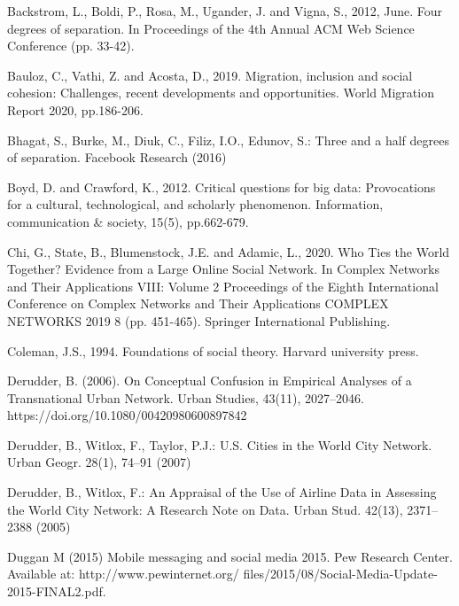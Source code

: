 \documentclass[12pt]{article}
\begin{document}
Backstrom, L., Boldi, P., Rosa, M., Ugander, J. and Vigna, S., 2012, June. Four degrees of separation. In Proceedings of the 4th Annual ACM Web Science Conference (pp. 33-42).
\newline

Bauloz, C., Vathi, Z. and Acosta, D., 2019. Migration, inclusion and social cohesion: Challenges, recent developments and opportunities. World Migration Report 2020, pp.186-206.
\newline

Bhagat, S., Burke, M., Diuk, C., Filiz, I.O., Edunov, S.: Three and a half degrees of separation. Facebook Research (2016)
\newline

Boyd, D. and Crawford, K., 2012. Critical questions for big data: Provocations for a cultural, technological, and scholarly phenomenon. Information, communication \& society, 15(5), pp.662-679.
\newline

Chi, G., State, B., Blumenstock, J.E. and Adamic, L., 2020. Who Ties the World Together? Evidence from a Large Online Social Network. In Complex Networks and Their Applications VIII: Volume 2 Proceedings of the Eighth International Conference on Complex Networks and Their Applications COMPLEX NETWORKS 2019 8 (pp. 451-465). Springer International Publishing.
\newline

Coleman, J.S., 1994. Foundations of social theory. Harvard university press.
\newline

Derudder, B. (2006). On Conceptual Confusion in Empirical Analyses of a Transnational Urban Network. Urban Studies, 43(11), 2027–2046. https://doi.org/10.1080/00420980600897842
\newline

Derudder, B., Witlox, F., Taylor, P.J.: U.S. Cities in the World City Network. Urban Geogr. 28(1), 74–91 (2007)
\newline

Derudder, B., Witlox, F.: An Appraisal of the Use of Airline Data in Assessing the World City Network: A Research Note on Data. Urban Stud. 42(13), 2371–2388 (2005)
\newline

Duggan M (2015) Mobile messaging and social media 2015. Pew Research Center. Available at: http://www.pewinternet.org/ files/2015/08/Social-Media-Update-2015-FINAL2.pdf.
\newline
\end{document}
